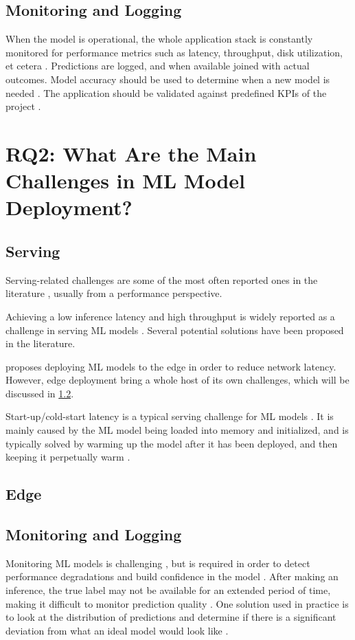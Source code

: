 \subsection{Monitoring and Logging}
When the model is operational, the whole application stack is constantly monitored for performance metrics such as latency, throughput, disk utilization, et cetera \cite{Ruf2021, Peticolas2019}.
Predictions are logged, and when available joined with actual outcomes\cite{Li2017}.
Model accuracy should be used to determine when a new model is needed \cite{Peticolas2019}.
The application should be validated against predefined KPIs of the project \cite{Ruf2021}.

\section{RQ2: What Are the Main Challenges in ML Model Deployment?}
\subsection{Serving}
Serving-related challenges are some of the most often reported ones in the literature \cite{Bosch2021, Richins2020, Li2017, Baylor2017, Garcia2020, Crankshaw2017, Lwakatare2019, Bernardi2019, Yadwadkar2019, Chahal2020, Choi2021, Zhang2020, Gupta2020}, usually from a performance perspective.

Achieving a low inference latency and high throughput is widely reported as a challenge in serving ML models \cite{Bosch2021, Li2017,Crankshaw2017,Lwakatare2019,Bernardi2019}.
Several potential solutions have been proposed in the literature.

\textcite{Gupta2020} proposes deploying ML models to the edge in order to reduce network latency. However, edge deployment bring a whole host of its own challenges, which will be discussed in \cref{ch:results:rq2:edge}.

Start-up/cold-start latency is a typical serving challenge for ML models \cite{Yadwadkar2019}. It is mainly caused by the ML model being loaded into memory and initialized, and is typically solved by warming up the model after it has been deployed, and then keeping it perpetually warm \cite{Zhang2020}.

\subsection{Edge}
\label{ch:results:rq2:edge}

\subsection{Monitoring and Logging}
Monitoring ML models is challenging \cite{Li2017, Bernardi2019}, but is required in order to detect performance degradations and build confidence in the model \cite{Bosch2021}.
After making an inference, the true label may not be available for an extended period of time, making it difficult to monitor prediction quality \cite{Bernardi2019}.
One solution used in practice is to look at the distribution of predictions and determine if there is a significant deviation from what an ideal model would look like \cite{Bernardi2019}.

